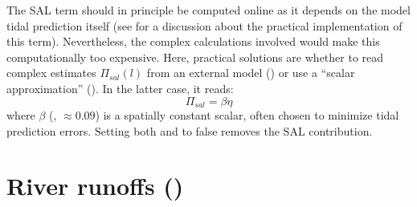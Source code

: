 \documentclass[../tex_main/NEMO_manual]{subfiles}
\begin{document}
The SAL term should in principle be computed online as it depends on the model tidal prediction itself
(see \citet{Arbic2004} for a discussion about the practical implementation of this term).
Nevertheless, the complex calculations involved would make this computationally too expensive.
Here, practical solutions are whether to read complex estimates $\Pi_{sal}(l)$ from an external model
() or use a ``scalar approximation'' ().
In the latter case, it reads:\\
\begin{equation}
\Pi_{sal} = \beta \eta
\end{equation}
where $\beta$ (, $\approx0.09$) is a spatially constant scalar,
often chosen to minimize tidal prediction errors.
Setting both  and  to false removes the SAL contribution.

\section{River runoffs (\protect{})}
\label{sec:SBC_rnf}




\end{document}
